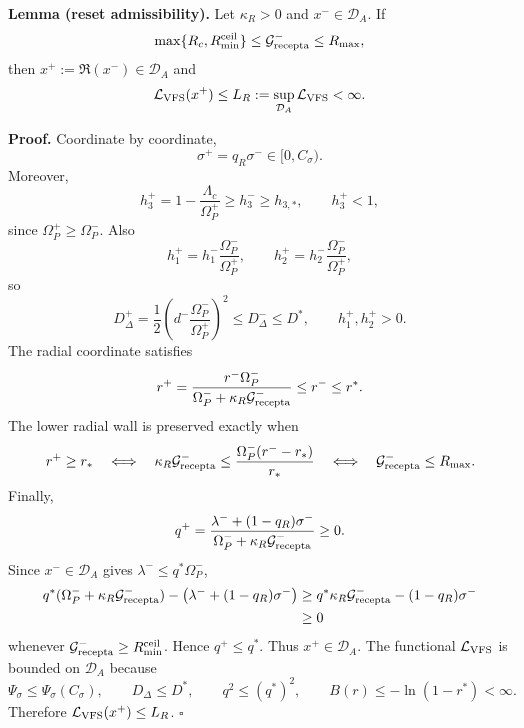 \documentclass[11pt,a4paper]{article}
\newcommand{\DA}{\mathcal D_A}
\newcommand{\LV}{\mathcal L_{\rm VFS}}
\newcommand{\Grec}{\mathcal G_{\rm recepta}}
\newcommand{\Om}{\Omega_P}
\newcommand{\reset}{\mathfrak{R}}
\theoremstyle{plain}
\theoremstyle{definition}
\theoremstyle{remark}
\begin{document}
\textbf{Lemma (reset admissibility).}
Let $\kappa_R>0$ and $x^-\in\DA$. If
\begin{equation}
  \max\{R_c,R_{\min}^{\rm ceil}\}\le\Grec^-\le R_{\max},
\end{equation}
then $x^+:=\reset(x^-)\in\DA$ and
\begin{equation}
  \LV(x^+)\le L_R:=\sup_{\DA}\LV<\infty.
\end{equation}

\textbf{Proof.} Coordinate by coordinate,
\begin{equation}
  \sigma^+=q_R\sigma^-\in[0,C_\sigma).
\end{equation}
Moreover,
\begin{equation}
  h_3^+=1-\frac{\Lambda_c}{\Om^+}
  \ge h_3^-\ge h_{3,*},
  \qquad
  h_3^+<1,
\end{equation}
since $\Om^+\ge\Om^-$. Also
\begin{equation}
  h_1^+=h_1^-\frac{\Om^-}{\Om^+},
  \qquad
  h_2^+=h_2^-\frac{\Om^-}{\Om^+},
\end{equation}
so
\begin{equation}
  D_\Delta^+=\frac12\left(d^-\frac{\Om^-}{\Om^+}\right)^2
  \le D_\Delta^-\le D^*,
  \qquad
  h_1^+,h_2^+>0.
\end{equation}
The radial coordinate satisfies
\begin{equation}
  r^+=\frac{r^-\Om^-}{\Om^-+\kappa_R\Grec^-}
  \le r^-\le r^*.
\end{equation}
The lower radial wall is preserved exactly when
\begin{equation}
  r^+\ge r_*
  \quad\Longleftrightarrow\quad
  \kappa_R\Grec^-\le\frac{\Om^-(r^--r_*)}{r_*}
  \quad\Longleftrightarrow\quad
  \Grec^-\le R_{\max}.
\end{equation}
Finally,
\begin{equation}
  q^+=
  \frac{\lambda^-+(1-q_R)\sigma^-}{\Om^-+\kappa_R\Grec^-}
  \ge0.
\end{equation}
Since $x^-\in\DA$ gives $\lambda^-\le q^*\Om^-$,
\begin{equation}
\begin{aligned}
  q^*(\Om^-+\kappa_R\Grec^-)
  -\bigl(\lambda^-+(1-q_R)\sigma^-\bigr)
  &\ge
  q^*\kappa_R\Grec^--(1-q_R)\sigma^-\\
  &\ge0
\end{aligned}
\end{equation}
whenever $\Grec^-\ge R_{\min}^{\rm ceil}$. Hence $q^+\le q^*$.
Thus $x^+\in\DA$. The functional $\LV$ is bounded on $\DA$ because
\begin{equation}
  \Psi_\sigma\le\Psi_\sigma(C_\sigma),
  \qquad
  D_\Delta\le D^*,
  \qquad
  q^2\le(q^*)^2,
  \qquad
  B(r)\le-\ln(1-r^*)<\infty.
\end{equation}
Therefore $\LV(x^+)\le L_R$. \hfill$\square$
\end{document}

